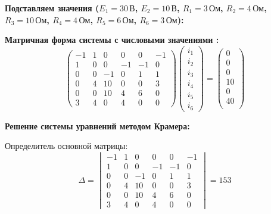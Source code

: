 \textbf{Подставляем значения ($E_1=30\,\text{В}$, $E_2=10\,\text{В}$, $R_1=3\,\text{Ом}$, $R_2=4\,\text{Ом}$, $R_3=10\,\text{Ом}$, $R_4=4\,\text{Ом}$, $R_5=6\,\text{Ом}$, $R_6=3\,\text{Ом}$):}


\textbf{Матричная форма системы с числовыми значениями :}
$$\begin{pmatrix}
-1 &  1 &  0 &  0 &  0 & -1 \\
 1 &  0 &  0 & -1 & -1 &  0 \\
 0 &  0 & -1 &  0 &  1 &  1 \\
 0 &  4 & 10 &  0 &  0 &  3 \\
 0 &  0 & 10 &  4 &  6 &  0 \\
 3 &  4 &  0 &  4 &  0 &  0
\end{pmatrix}
\begin{pmatrix}
i_1 \\
i_2 \\
i_3 \\
i_4 \\
 i_5 \\
i_6
\end{pmatrix}
=
\begin{pmatrix}
0 \\
0 \\
0 \\
10 \\
0 \\
40 \\
\end{pmatrix}$$


\textbf{Решение системы уравнений методом Крамера:}

Определитель основной матрицы:
\begin{equation}
\Delta = \begin{vmatrix}
-1 &  1 &  0 &  0 &  0 & -1 \\
 1 &  0 &  0 & -1 & -1 &  0 \\
 0 &  0 & -1 &  0 &  1 &  1 \\
 0 &  4 & 10 &  0 &  0 &  3 \\
 0 &  0 & 10 &  4 &  6 &  0 \\
 3 &  4 &  0 &  4 &  0 &  0
\end{vmatrix} = 153
\end{equation}

